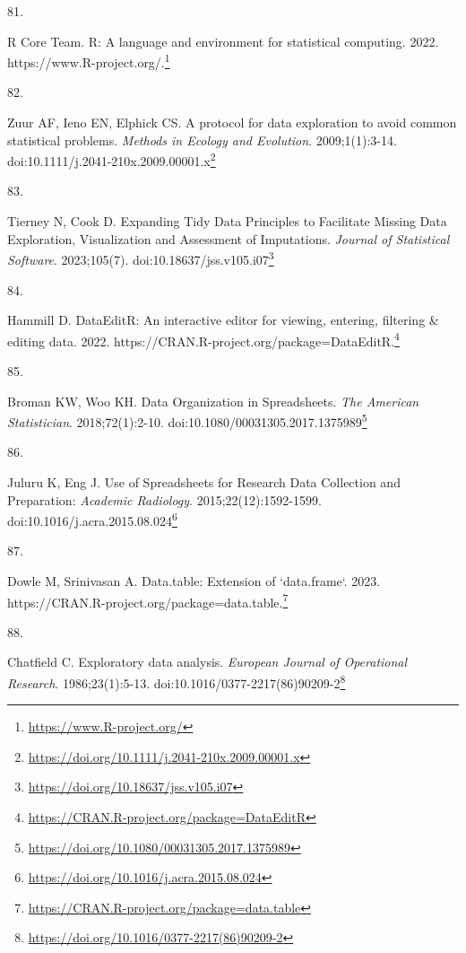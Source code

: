 \documentclass[
  a4paper,
]{book}
\newlength{\cslhangindent}
\newlength{\csllabelwidth}
\newlength{\cslentryspacingunit} %
\newenvironment{CSLReferences}[2] %
 {%
  \setlength{\parindent}{0pt}
  \ifodd #1
  \let\oldpar\par
  \def\par{\hangindent=\cslhangindent\oldpar}
  \fi
  \setlength{\parskip}{#2\cslentryspacingunit}
 }%
 {}
\newcommand{\CSLLeftMargin}[1]{\parbox[t]{\csllabelwidth}{#1}}
\newcommand{\CSLRightInline}[1]{\parbox[t]{\linewidth - \csllabelwidth}{#1}\break}
\renewcommand{\href}[2]{#2\footnote{\url{#1}}}
\begin{document}
\begin{CSLReferences}{0}{0}
\leavevmode{}%
\CSLLeftMargin{81. }%
\CSLRightInline{R Core Team. R: A language and environment for statistical computing. 2022. \href{https://www.R-project.org/}{https://www.R-project.org/.}}

\leavevmode{}%
\CSLLeftMargin{82. }%
\CSLRightInline{Zuur AF, Ieno EN, Elphick CS. A protocol for data exploration to avoid common statistical problems. \emph{Methods in Ecology and Evolution}. 2009;1(1):3-14. doi:\href{https://doi.org/10.1111/j.2041-210x.2009.00001.x}{10.1111/j.2041-210x.2009.00001.x}}

\leavevmode{}%
\CSLLeftMargin{83. }%
\CSLRightInline{Tierney N, Cook D. Expanding Tidy Data Principles to Facilitate Missing Data Exploration, Visualization and Assessment of Imputations. \emph{Journal of Statistical Software}. 2023;105(7). doi:\href{https://doi.org/10.18637/jss.v105.i07}{10.18637/jss.v105.i07}}

\leavevmode{}%
\CSLLeftMargin{84. }%
\CSLRightInline{Hammill D. DataEditR: An interactive editor for viewing, entering, filtering \& editing data. 2022. \href{https://CRAN.R-project.org/package=DataEditR}{https://CRAN.R-project.org/package=DataEditR.}}

\leavevmode{}%
\CSLLeftMargin{85. }%
\CSLRightInline{Broman KW, Woo KH. Data Organization in Spreadsheets. \emph{The American Statistician}. 2018;72(1):2-10. doi:\href{https://doi.org/10.1080/00031305.2017.1375989}{10.1080/00031305.2017.1375989}}

\leavevmode{}%
\CSLLeftMargin{86. }%
\CSLRightInline{Juluru K, Eng J. Use of Spreadsheets for Research Data Collection and Preparation: \emph{Academic Radiology}. 2015;22(12):1592-1599. doi:\href{https://doi.org/10.1016/j.acra.2015.08.024}{10.1016/j.acra.2015.08.024}}

\leavevmode{}%
\CSLLeftMargin{87. }%
\CSLRightInline{Dowle M, Srinivasan A. Data.table: Extension of `data.frame`. 2023. \href{https://CRAN.R-project.org/package=data.table}{https://CRAN.R-project.org/package=data.table.}}

\leavevmode{}%
\CSLLeftMargin{88. }%
\CSLRightInline{Chatfield C. Exploratory data analysis. \emph{European Journal of Operational Research}. 1986;23(1):5-13. doi:\href{https://doi.org/10.1016/0377-2217(86)90209-2}{10.1016/0377-2217(86)90209-2}}


\end{CSLReferences}
\end{document}
